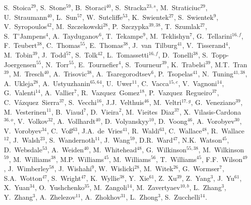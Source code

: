 \documentclass[12pt,a4paper]{article}
\begin{document}
\begin{flushleft}
S.~Stoica$^{29}$, 
S.~Stone$^{59}$, 
B.~Storaci$^{40}$, 
S.~Stracka$^{23,s}$, 
M.~Straticiuc$^{29}$, 
U.~Straumann$^{40}$, 
L.~Sun$^{57}$, 
W.~Sutcliffe$^{53}$, 
K.~Swientek$^{27}$, 
S.~Swientek$^{9}$, 
V.~Syropoulos$^{42}$, 
M.~Szczekowski$^{28}$, 
P.~Szczypka$^{39,38}$, 
T.~Szumlak$^{27}$, 
S.~T'Jampens$^{4}$, 
A.~Tayduganov$^{6}$, 
T.~Tekampe$^{9}$, 
M.~Teklishyn$^{7}$, 
G.~Tellarini$^{16,f}$, 
F.~Teubert$^{38}$, 
C.~Thomas$^{55}$, 
E.~Thomas$^{38}$, 
J.~van~Tilburg$^{41}$, 
V.~Tisserand$^{4}$, 
M.~Tobin$^{39}$, 
J.~Todd$^{57}$, 
S.~Tolk$^{42}$, 
L.~Tomassetti$^{16,f}$, 
D.~Tonelli$^{38}$, 
S.~Topp-Joergensen$^{55}$, 
N.~Torr$^{55}$, 
E.~Tournefier$^{4}$, 
S.~Tourneur$^{39}$, 
K.~Trabelsi$^{39}$, 
M.T.~Tran$^{39}$, 
M.~Tresch$^{40}$, 
A.~Trisovic$^{38}$, 
A.~Tsaregorodtsev$^{6}$, 
P.~Tsopelas$^{41}$, 
N.~Tuning$^{41,38}$, 
A.~Ukleja$^{28}$, 
A.~Ustyuzhanin$^{65,64}$, 
U.~Uwer$^{11}$, 
C.~Vacca$^{15,e}$, 
V.~Vagnoni$^{14}$, 
G.~Valenti$^{14}$, 
A.~Vallier$^{7}$, 
R.~Vazquez~Gomez$^{18}$, 
P.~Vazquez~Regueiro$^{37}$, 
C.~V\'{a}zquez~Sierra$^{37}$, 
S.~Vecchi$^{16}$, 
J.J.~Velthuis$^{46}$, 
M.~Veltri$^{17,g}$, 
G.~Veneziano$^{39}$, 
M.~Vesterinen$^{11}$, 
B.~Viaud$^{7}$, 
D.~Vieira$^{2}$, 
M.~Vieites~Diaz$^{37}$, 
X.~Vilasis-Cardona$^{36,o}$, 
V.~Volkov$^{32}$, 
A.~Vollhardt$^{40}$, 
D.~Volyanskyy$^{10}$, 
D.~Voong$^{46}$, 
A.~Vorobyev$^{30}$, 
V.~Vorobyev$^{34}$, 
C.~Vo\ss$^{63}$, 
J.A.~de~Vries$^{41}$, 
R.~Waldi$^{63}$, 
C.~Wallace$^{48}$, 
R.~Wallace$^{12}$, 
J.~Walsh$^{23}$, 
S.~Wandernoth$^{11}$, 
J.~Wang$^{59}$, 
D.R.~Ward$^{47}$, 
N.K.~Watson$^{45}$, 
D.~Websdale$^{53}$, 
A.~Weiden$^{40}$, 
M.~Whitehead$^{48}$, 
G.~Wilkinson$^{55,38}$, 
M.~Wilkinson$^{59}$, 
M.~Williams$^{38}$, 
M.P.~Williams$^{45}$, 
M.~Williams$^{56}$, 
T.~Williams$^{45}$, 
F.F.~Wilson$^{49}$, 
J.~Wimberley$^{58}$, 
J.~Wishahi$^{9}$, 
W.~Wislicki$^{28}$, 
M.~Witek$^{26}$, 
G.~Wormser$^{7}$, 
S.A.~Wotton$^{47}$, 
S.~Wright$^{47}$, 
K.~Wyllie$^{38}$, 
Y.~Xie$^{61}$, 
Z.~Xu$^{39}$, 
Z.~Yang$^{3}$, 
J.~Yu$^{61}$, 
X.~Yuan$^{34}$, 
O.~Yushchenko$^{35}$, 
M.~Zangoli$^{14}$, 
M.~Zavertyaev$^{10,b}$, 
L.~Zhang$^{3}$, 
Y.~Zhang$^{3}$, 
A.~Zhelezov$^{11}$, 
A.~Zhokhov$^{31}$, 
L.~Zhong$^{3}$, 
S.~Zucchelli$^{14}$.\bigskip


\end{flushleft}
\end{document}
